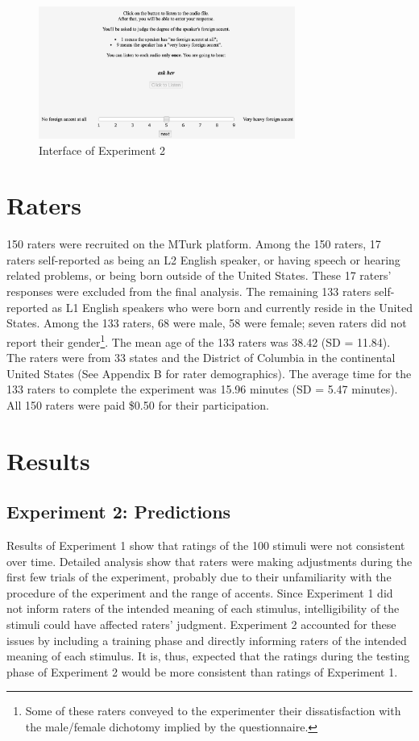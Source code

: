 \begin{figure}[!h]
  \figSpace
    \centering
	\includegraphics[width=0.75\textwidth]{figures/exp2.jpg}
    \caption{Interface of Experiment 2}
    \label{fig:exp2}
  \figSpace
\end{figure}

\section{Raters}

150 raters were recruited on the MTurk platform. Among the 150 raters, 17 raters self-reported as being an L2 English speaker, or having speech or hearing related problems, or being born outside of the United States. These 17 raters’ responses were excluded from the final analysis. The remaining 133 raters self-reported as L1 English speakers who were born and currently reside in the United States. Among the 133 raters, 68 were male, 58 were female; seven raters did not report their gender\footnote{Some of these raters conveyed to the experimenter their dissatisfaction with the male/female dichotomy implied by the questionnaire.}. The mean age of the 133 raters was 38.42 (SD = 11.84). The raters were from 33 states and the District of Columbia in the continental United States (See Appendix B for rater demographics). The average time for the 133 raters to complete the experiment was 15.96 minutes (SD = 5.47 minutes). All 150 raters were paid \$0.50 for their participation.

\section{Results}
\subsection{Experiment 2: Predictions}

Results of Experiment 1 show that ratings of the 100 stimuli were not consistent over time. Detailed analysis show that raters were making adjustments during the first few trials of the experiment, probably due to their unfamiliarity with the procedure of the experiment and the range of accents. Since Experiment 1 did not inform raters of the intended meaning of each stimulus, intelligibility of the stimuli could have affected raters’ judgment. Experiment 2 accounted for these issues by including a training phase and directly informing raters of the intended meaning of each stimulus. It is, thus, expected that the ratings during the testing phase of Experiment 2 would be more consistent than ratings of Experiment 1. 

